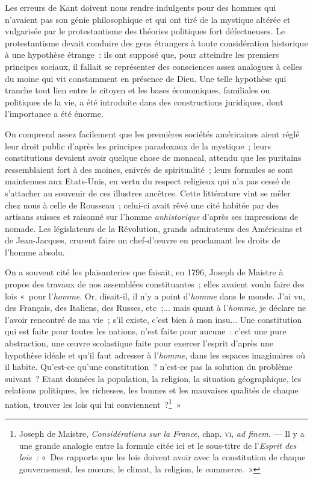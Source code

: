 \documentclass[french,twoside]{book} %
\begin{document}
\noindent Les erreurs de Kant doivent nous rendre indulgents pour des hommes qui n’avaient pas son génie philosophique et qui ont tiré de la mystique altérée et vulgarisée par le protestantisme des théories politiques fort défectueuses. Le protestantisme devait conduire des gens étrangers à toute considération historique à une hypothèse étrange : ils ont supposé que, pour atteindre les premiers principes sociaux, il fallait se représenter des consciences assez analogues à celles du moine qui vit constamment en présence de Dieu. Une telle hypothèse qui tranche tout lien entre le citoyen et les bases économiques, familiales ou politiques de la vie, a été introduite dans des constructions juridiques, dont l’importance a été énorme.\par
On comprend assez facilement que les premières sociétés américaines aient réglé leur droit public d’après les principes paradoxaux de la mystique ; leurs constitutions devaient avoir quelque chose de monacal, attendu que les puritains ressemblaient fort à des moines, enivrés de spiritualité ; leurs formules se sont maintenues aux Etats-Unis, en vertu du respect religieux qui n’a pas cessé de s’attacher au souvenir de ces illustres ancêtres. Cette littérature vint se mêler chez nous à celle de  Rousseau ; celui-ci avait rêvé une cité habitée par des artisans suisses et raisonné sur l’homme \emph{anhistorique} d’après ses impressions de nomade. Les législateurs de la Révolution, grands admirateurs des Américains et de Jean-Jacques, crurent faire un chef-d’œuvre en proclamant les droits de l’homme absolu.\par
On a souvent cité les plaisanteries que faisait, en 1796, Joseph de Maistre à propos des travaux de nos assemblées constituantes ; elles avaient voulu faire des lois « pour l’\emph{homme}. Or, disait-il, il n’y a point d’\emph{homme} dans le monde. J’ai vu, des Français, des Italiens, des Russes, etc ;... mais quant à l’\emph{homme}, je déclare ne l’avoir rencontré de ma vie ; s’il existe, c’est bien à mon insu... Une constitution qui est faite pour toutes les nations, n’est faite pour aucune : c’est une pure abstraction, une œuvre scolastique faite pour exercer l’esprit d’après une hypothèse idéale et qu’il faut adresser à l’\emph{homme}, dans les espaces imaginaires où il habite. Qu’est-ce qu’une constitution ? n’est-ce pas la solution du problème suivant ? Etant données la population, la religion, la situation géographique, les relations politiques, les richesses, les bonnes et les mauvaises qualités de chaque nation, trouver les lois qui lui conviennent ?\footnote{ \noindent Joseph de Maistre, \emph{Considérations sur la France}, chap. {\scshape vi}, \emph{ad finem}. — Il y a une grande analogie entre la formule citée ici et le sous-titre de l’\emph{Esprit des lois :} « Des rapports que les lois doivent avoir avec la constitution de chaque gouvernement, les mœurs, le climat, la religion, le commerce. »
 } »\par
\end{document}
